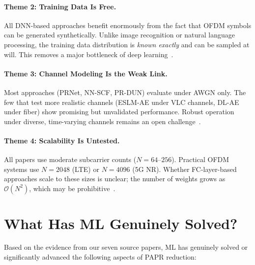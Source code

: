 \paragraph{Theme 2: Training Data Is Free.}
All DNN-based approaches benefit enormously from the fact that OFDM symbols can be generated synthetically.
Unlike image recognition or natural language processing, the training data distribution is \emph{known exactly} and can be sampled at will. This removes a major bottleneck of deep learning~\cite{da2024survey}.

\paragraph{Theme 3: Channel Modeling Is the Weak Link.}
Most approaches (PRNet, NN-SCF, PR-DUN) evaluate under AWGN only. The few that test more realistic channels (ESLM-AE under VLC channels, DL-AE under fiber) show promising but unvalidated performance. Robust operation under diverse, time-varying channels remains an open challenge~\cite{da2024survey}.

\paragraph{Theme 4: Scalability Is Untested.}
All papers use moderate subcarrier counts ($N = 64$--$256$). Practical OFDM systems use $N = 2048$ (LTE) or $N = 4096$ (5G NR). Whether FC-layer-based approaches scale to these sizes is unclear; the number of weights grows as $\mathcal{O}(N^2)$, which may be prohibitive~\cite{da2024survey}.

\section{What Has ML Genuinely Solved?}
\label{sec:solved}

Based on the evidence from our seven source papers, ML has genuinely solved or significantly advanced the following aspects of PAPR reduction:

